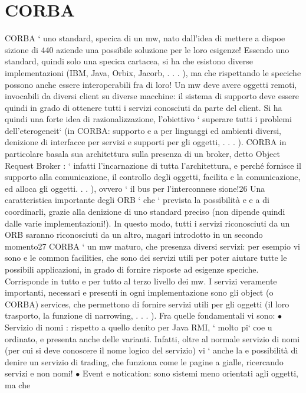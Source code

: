 \documentclass[a4paper,12pt]{article}
\begin{document}
\section{CORBA}
CORBA ` uno standard, specica di un mw, nato dall'idea di mettere a dispoe
sizione di 440 aziende una possibile soluzione per le loro esigenze!
Essendo uno standard, quindi solo una specica cartacea, si ha che esistono
diverse implementazioni (IBM, Java, Orbix, Jacorb, . . . ), ma che rispettando le
speciche possono anche essere interoperabili fra di loro!
Un mw deve avere oggetti remoti, invocabili da diversi client su diverse macchine: il sistema di supporto deve essere
quindi in grado di ottenere tutti i servizi
conosciuti da parte del client. Si ha quindi una forte idea di razionalizzazione,
l'obiettivo ` superare tutti i problemi dell'eterogeneit` (in CORBA: supporto
e
a
per linguaggi ed ambienti diversi, denizione di interfacce per servizi e supporti
per gli oggetti, . . . ).
CORBA in particolare basala sua architettura sulla presenza di un broker,
detto Object Request Broker : ` infatti l'incarnazione di tutta l'architettura,
e
perché fornisce il supporto alla comunicazione, il controllo degli oggetti, facilita
e
la comunicazione, ed alloca gli oggetti. . . ), ovvero ` il bus per l'interconnese
sione!26 Una caratteristica importante degli ORB ` che ` prevista la possibilità
e
e
a
di coordinarli, grazie alla denizione di uno standard preciso (non dipende quindi dalle varie implementazioni!). In
questo modo, tutti i servizi riconosciuti da
un ORB saranno riconosciuti da un altro, magari introdotto in un secondo
momento27
CORBA ` un mw maturo, che presenza diversi servizi: per esempio vi sono
e
le common facilities, che sono dei servizi utili per poter aiutare tutte le possibili
applicazioni, in grado di fornire risposte ad esigenze speciche. Corrisponde in
tutto e per tutto al terzo livello dei mw.
I servizi veramente importanti, necessari e presenti in ogni implementazione
sono gli object (o CORBA) services, che permettono di fornire servizi utili per gli
oggetti (il loro trasporto, la funzione di narrowing, . . . ). Fra quelle fondamentali
vi sono:
$\bullet$ Servizio di nomi : rispetto a quello denito per Java RMI, ` molto pi` coe
u
ordinato, e presenta anche delle varianti. Infatti, oltre al normale servizio
di nomi (per cui si deve conoscere il nome logico del servizio) vi ` anche la
e
possibilità di denire un servizio di trading, che funziona come le pagine
a
gialle, ricercando servizi e non nomi!
$\bullet$ Event e notication: sono sistemi meno orientati agli oggetti, ma che
\end{document}
